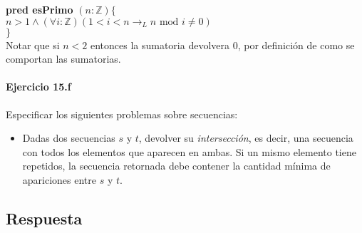 \documentclass[a4paper]{article}
\begin{document}
			
			
			
			
			\textbf{pred esPrimo} $(n: \mathbb{Z})\{$\\ 
			\hspace*{6mm}$ n > 1 \wedge(\forall i :\mathbb{Z})
			(1<i<n \rightarrow _L n\textrm{ mod }i\neq 0 )$\\
			\hspace*{5mm}$\}$\smallskip \\
			
Notar que si $n<2$ entonces la sumatoria devolvera 0, por definición de como se comportan las 
sumatorias.
			
\paragraph*{Ejercicio 15.f} Especificar los siguientes problemas sobre secuencias:
	\begin{itemize}
		\item Dadas dos secuencias $s$ y $t$, devolver su \textit{intersección}, es
				decir, una secuencia con todos los elementos que aparecen en ambas. Si un mismo
				elemento tiene repetidos, la secuencia retornada debe contener la cantidad
				mínima de apariciones entre $s$ y $t$.
	\end{itemize}

\subsection*{Respuesta}
\end{document}
